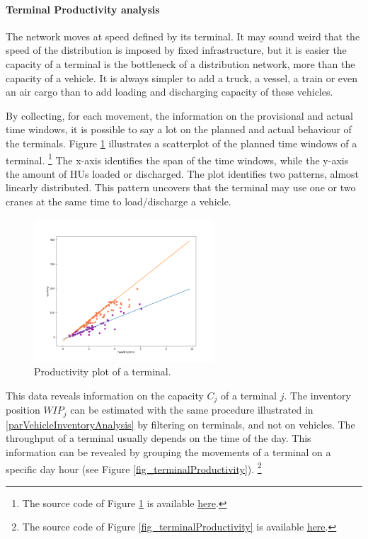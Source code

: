 \paragraph{Terminal Productivity analysis}
The network moves at speed defined by its terminal. It may sound weird that the speed of the distribution is imposed by fixed infrastructure, but it is easier the capacity of a terminal is the bottleneck of a distribution network, more than the capacity of a vehicle. It is always simpler to add a truck, a vessel, a train or even an air cargo than to add loading and discharging capacity of these vehicles.\par

By collecting, for each movement, the information on the provisional and actual time windows, it is possible to say a lot on the planned and actual behaviour of the terminals. Figure \ref{fig_terminalLinearProductivity} illustrates a scatterplot of the planned time windows of a terminal. \footnote{The source code of Figure \ref{fig_terminalLinearProductivity} is available \href{https://github.com/aletuf93/logproj/blob/master/examples/DIST_01\%20Supply\%20Chain\%20Assessment.ipynb}{here}.} The x-axis identifies the span of the time windows, while the y-axis the amount of HUs loaded or discharged. The plot identifies two patterns, almost linearly distributed. This pattern uncovers that the terminal may use one or two cranes at the same time to load/discharge a vehicle.

\begin{figure}[hbt!]
\centering
\includegraphics[width=0.6\textwidth]{SectionDistribution/control_figures/fig_terminalLinearProductivity.png}
\captionsetup{type=figure}
\caption{Productivity plot of a terminal.}
\label{fig_terminalLinearProductivity}
\end{figure}

This data reveals information on the capacity $C_j$ of a terminal $j$. The inventory position $WIP_j$ can be estimated with the same procedure illustrated in \ref{parVehicleInventoryAnalysis} by filtering on terminals, and not on vehicles. The throughput of a terminal usually depends on the time of the day. This information can be revealed by grouping the movements of a terminal on a specific day hour (see Figure \ref{fig_terminalProductivity}). \footnote{The source code of Figure \ref{fig_terminalProductivity} is available \href{https://github.com/aletuf93/logproj/blob/master/examples/DIST_01\%20Supply\%20Chain\%20Assessment.ipynb}{here}.}

